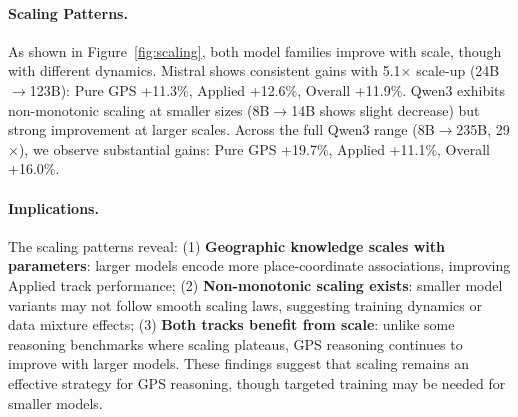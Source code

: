 \paragraph{Scaling Patterns.}
As shown in Figure~\ref{fig:scaling}, both model families improve with scale, though with different dynamics. Mistral shows consistent gains with 5.1$\times$ scale-up (24B$\rightarrow$123B): Pure GPS +11.3\%, Applied +12.6\%, Overall +11.9\%. Qwen3 exhibits non-monotonic scaling at smaller sizes (8B$\rightarrow$14B shows slight decrease) but strong improvement at larger scales. Across the full Qwen3 range (8B$\rightarrow$235B, 29$\times$), we observe substantial gains: Pure GPS +19.7\%, Applied +11.1\%, Overall +16.0\%.

\paragraph{Implications.}
The scaling patterns reveal: (1) \textbf{Geographic knowledge scales with parameters}: larger models encode more place-coordinate associations, improving Applied track performance; (2) \textbf{Non-monotonic scaling exists}: smaller model variants may not follow smooth scaling laws, suggesting training dynamics or data mixture effects; (3) \textbf{Both tracks benefit from scale}: unlike some reasoning benchmarks where scaling plateaus, GPS reasoning continues to improve with larger models. These findings suggest that scaling remains an effective strategy for GPS reasoning, though targeted training may be needed for smaller models.
